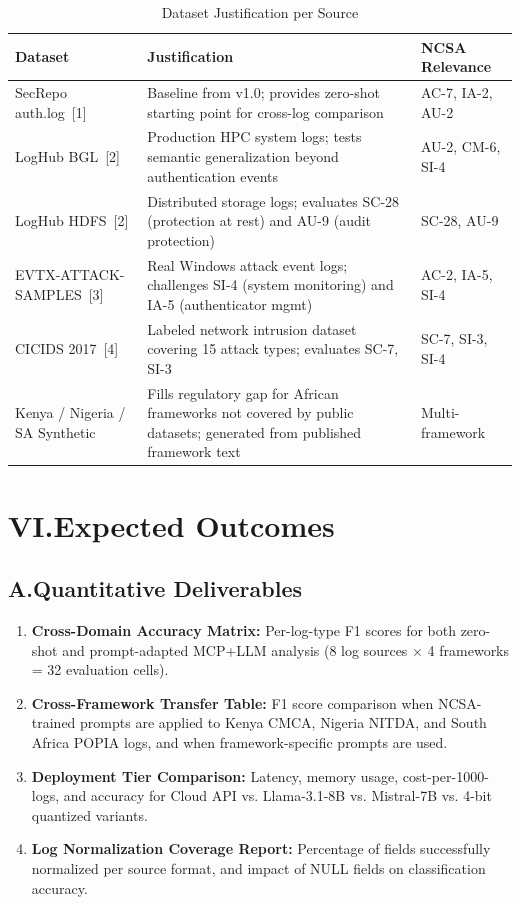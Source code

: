 \documentclass[12pt]{article}
\begin{document}
\begin{table}[h]
\centering
\caption{Dataset Justification per Source}
\label{tab:justification}
\begin{tabular}{@{}p{3cm}p{5cm}p{5cm}@{}}
\toprule
\textbf{Dataset} & \textbf{Justification} & \textbf{NCSA Relevance} \\
\midrule
SecRepo auth.log~[1] & Baseline from v1.0; provides zero-shot starting point for cross-log comparison & AC-7, IA-2, AU-2 \\
LogHub BGL~[2] & Production HPC system logs; tests semantic generalization beyond authentication events & AU-2, CM-6, SI-4 \\
LogHub HDFS~[2] & Distributed storage logs; evaluates SC-28 (protection at rest) and AU-9 (audit protection) & SC-28, AU-9 \\
EVTX-ATTACK-SAMPLES~[3] & Real Windows attack event logs; challenges SI-4 (system monitoring) and IA-5 (authenticator mgmt) & AC-2, IA-5, SI-4 \\
CICIDS 2017~[4] & Labeled network intrusion dataset covering 15 attack types; evaluates SC-7, SI-3 & SC-7, SI-3, SI-4 \\
Kenya / Nigeria / SA Synthetic & Fills regulatory gap for African frameworks not covered by public datasets; generated from published framework text & Multi-framework \\
\bottomrule
\end{tabular}
\end{table}

\bigskip

\section*{VI.\quad Expected Outcomes}

\subsection*{A.\quad Quantitative Deliverables}

\begin{enumerate}
    \item \textbf{Cross-Domain Accuracy Matrix:} Per-log-type F1 scores for both zero-shot and prompt-adapted MCP+LLM analysis (8 log sources $\times$ 4 frameworks = 32 evaluation cells).
    \item \textbf{Cross-Framework Transfer Table:} F1 score comparison when NCSA-trained prompts are applied to Kenya CMCA, Nigeria NITDA, and South Africa POPIA logs, and when framework-specific prompts are used.
    \item \textbf{Deployment Tier Comparison:} Latency, memory usage, cost-per-1000-logs, and accuracy for Cloud API vs. Llama-3.1-8B vs. Mistral-7B vs. 4-bit quantized variants.
    \item \textbf{Log Normalization Coverage Report:} Percentage of fields successfully normalized per source format, and impact of NULL fields on classification accuracy.
\end{enumerate}
\end{document}
